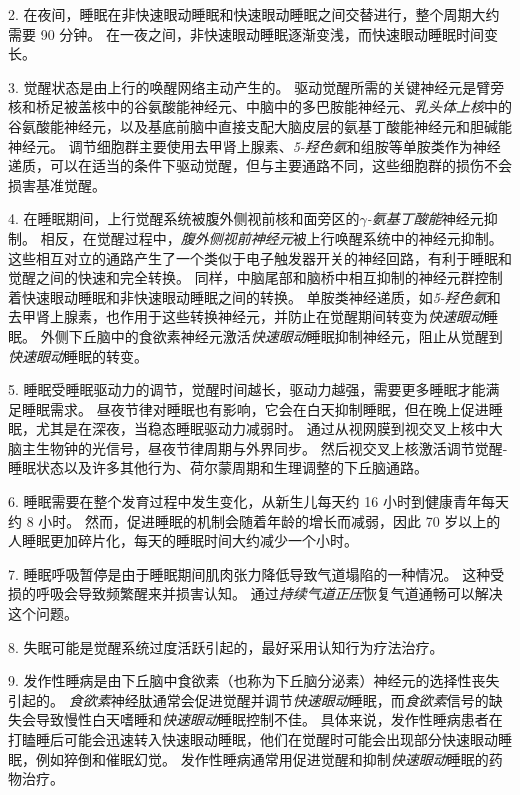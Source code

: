 2. 在夜间，睡眠在非快速眼动睡眠和快速眼动睡眠之间交替进行，整个周期大约需要 90 分钟。
在一夜之间，非快速眼动睡眠逐渐变浅，而快速眼动睡眠时间变长。


3. 觉醒状态是由上行的唤醒网络主动产生的。
驱动觉醒所需的关键神经元是臂旁核和桥足被盖核中的谷氨酸能神经元、中脑中的多巴胺能神经元、\textit{乳头体上核}中的谷氨酸能神经元，以及基底前脑中直接支配大脑皮层的氨基丁酸能神经元和胆碱能神经元。
调节细胞群主要使用去甲肾上腺素、\textit{5-羟色氨}和组胺等单胺类作为神经递质，可以在适当的条件下驱动觉醒，但与主要通路不同，这些细胞群的损伤不会损害基准觉醒。 


4. 在睡眠期间，上行觉醒系统被腹外侧视前核和面旁区的\textit{$\gamma$-氨基丁酸能}神经元抑制。
相反，在觉醒过程中，\textit{腹外侧视前神经元}被上行唤醒系统中的神经元抑制。
这些相互对立的通路产生了一个类似于电子触发器开关的神经回路，有利于睡眠和觉醒之间的快速和完全转换。
同样，中脑尾部和脑桥中相互抑制的神经元群控制着快速眼动睡眠和非快速眼动睡眠之间的转换。
单胺类神经递质，如\textit{5-羟色氨}和去甲肾上腺素，也作用于这些转换神经元，并防止在觉醒期间转变为\textit{快速眼动}睡眠。
外侧下丘脑中的食欲素神经元激活\textit{快速眼动}睡眠抑制神经元，阻止从觉醒到\textit{快速眼动}睡眠的转变。


5. 睡眠受睡眠驱动力的调节，觉醒时间越长，驱动力越强，需要更多睡眠才能满足睡眠需求。
昼夜节律对睡眠也有影响，它会在白天抑制睡眠，但在晚上促进睡眠，尤其是在深夜，当稳态睡眠驱动力减弱时。
通过从视网膜到视交叉上核中大脑主生物钟的光信号，昼夜节律周期与外界同步。
然后视交叉上核激活调节觉醒-睡眠状态以及许多其他行为、荷尔蒙周期和生理调整的下丘脑通路。


6. 睡眠需要在整个发育过程中发生变化，从新生儿每天约 16 小时到健康青年每天约 8 小时。
然而，促进睡眠的机制会随着年龄的增长而减弱，因此 70 岁以上的人睡眠更加碎片化，每天的睡眠时间大约减少一个小时。


7. 睡眠呼吸暂停是由于睡眠期间肌肉张力降低导致气道塌陷的一种情况。
这种受损的呼吸会导致频繁醒来并损害认知。
通过\textit{持续气道正压}恢复气道通畅可以解决这个问题。


8. 失眠可能是觉醒系统过度活跃引起的，最好采用认知行为疗法治疗。


9. 发作性睡病是由下丘脑中食欲素（也称为下丘脑分泌素）神经元的选择性丧失引起的。
\textit{食欲素}神经肽通常会促进觉醒并调节\textit{快速眼动}睡眠，而\textit{食欲素}信号的缺失会导致慢性白天嗜睡和\textit{快速眼动}睡眠控制不佳。
具体来说，发作性睡病患者在打瞌睡后可能会迅速转入快速眼动睡眠，他们在觉醒时可能会出现部分快速眼动睡眠，例如猝倒和催眠幻觉。
发作性睡病通常用促进觉醒和抑制\textit{快速眼动}睡眠的药物治疗。


